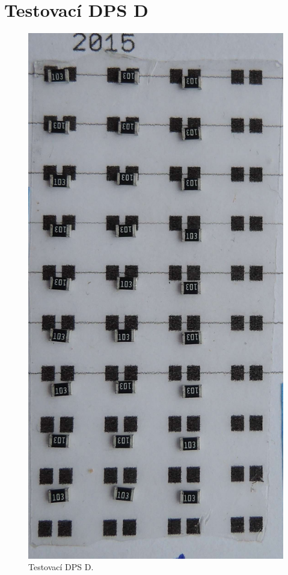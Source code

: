 \section{Testovací DPS D}
\begin{figure}[H]
  \centering
    \includegraphics[height=0.35\paperheight ]{obrazky/D2.jpg}%
    \caption{Testovací DPS D.}
    \label{img:DeskaD}
\end{figure}


